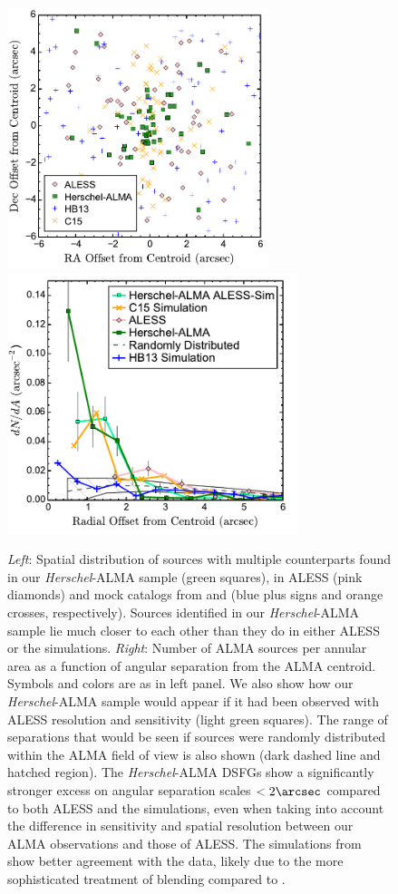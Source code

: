\documentclass[iop]{emulateapj}
\begin{document}
\begin{figure}[!tbp] 
\includegraphics[height=3in]{../Figures/AllPositions.pdf}
\includegraphics[height=3in]{../Figures/dNdA.pdf}

\caption{ {\it Left}: Spatial distribution of sources with multiple
counterparts found in our {\it Herschel}-ALMA sample (green squares), in ALESS
(pink diamonds) and mock catalogs from \citet{HB13} and \citet{Cowley:2015lr}
(blue plus signs and orange crosses, respectively).  Sources identified in our
{\it Herschel}-ALMA sample lie much closer to each other than they do in either
ALESS or the \citet{HB13} simulations.  {\it Right}: Number of ALMA sources per
annular area as a function of angular separation from the ALMA centroid.
Symbols and colors are as in left panel.  We also show how our {\it
Herschel}-ALMA sample would appear if it had been observed with ALESS
resolution and sensitivity (light green squares).  The range of separations
that would be seen if sources were randomly distributed within the ALMA field
of view is also shown (dark dashed line and hatched region).  The {\it
Herschel}-ALMA DSFGs show a significantly stronger excess on angular separation
scales $<2\arcsec$ compared to both ALESS and the \citet{HB13} simulations,
even when taking into account the difference in sensitivity and spatial
resolution between our ALMA observations and those of ALESS.  The simulations
from \citet{Cowley:2015lr} show better agreement with the data, likely due to
the more sophisticated treatment of blending compared to \citet{HB13}.}
\label{fig:dNdA}

\end{figure}
\end{document}
